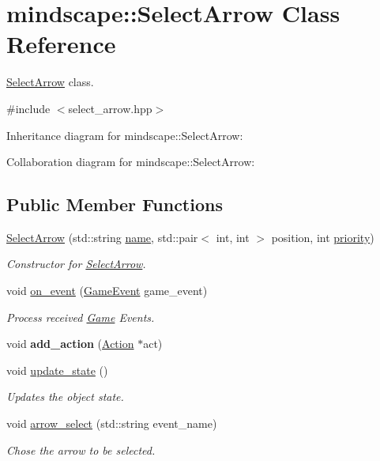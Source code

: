 \hypertarget{classmindscape_1_1_select_arrow}{}\section{mindscape\+:\+:Select\+Arrow Class Reference}
\label{classmindscape_1_1_select_arrow}


\hyperlink{classmindscape_1_1_select_arrow}{Select\+Arrow} class.  




{\ttfamily \#include $<$select\+\_\+arrow.\+hpp$>$}



Inheritance diagram for mindscape\+:\+:Select\+Arrow\+:


Collaboration diagram for mindscape\+:\+:Select\+Arrow\+:
\subsection*{Public Member Functions}
\begin{DoxyCompactItemize}
\item 
\hyperlink{classmindscape_1_1_select_arrow_ad6b1089e4898188b678b0f443781ced4}{Select\+Arrow} (std\+::string \hyperlink{classengine_1_1_game_object_a1f104f7af4f351e6d3278319762c9fe5}{name}, std\+::pair$<$ int, int $>$ position, int \hyperlink{classengine_1_1_game_object_a159ecaca30229e302793b11a75bd13c2}{priority})
\begin{DoxyCompactList}\small\item\em Constructor for \hyperlink{classmindscape_1_1_select_arrow}{Select\+Arrow}. \end{DoxyCompactList}\item 
void \hyperlink{classmindscape_1_1_select_arrow_aa9087f1fd52219fd23ad2cbdf717ca69}{on\+\_\+event} (\hyperlink{class_game_event}{Game\+Event} game\+\_\+event)
\begin{DoxyCompactList}\small\item\em Process received \hyperlink{class_game}{Game} Events. \end{DoxyCompactList}\item 
void {\bfseries add\+\_\+action} (\hyperlink{classmindscape_1_1_action}{Action} $\ast$act)\hypertarget{classmindscape_1_1_select_arrow_ab5cb745951fc1522112f4586b66a0c96}{}\label{classmindscape_1_1_select_arrow_ab5cb745951fc1522112f4586b66a0c96}

\item 
void \hyperlink{classmindscape_1_1_select_arrow_a25e2956765898f2e9273df5704fe5973}{update\+\_\+state} ()
\begin{DoxyCompactList}\small\item\em Updates the object state. \end{DoxyCompactList}\item 
void \hyperlink{classmindscape_1_1_select_arrow_a670507d263e6ae7a4f14ef01cc813d13}{arrow\+\_\+select} (std\+::string event\+\_\+name)
\begin{DoxyCompactList}\small\item\em Chose the arrow to be selected. \end{DoxyCompactList}\end{DoxyCompactItemize}
